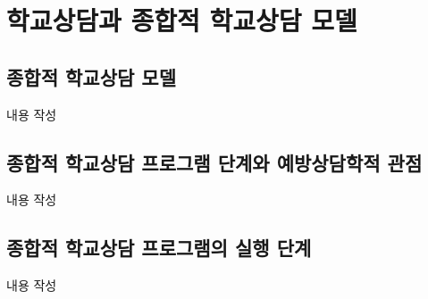 \section{학교상담과 종합적 학교상담 모델}

\subsection{종합적 학교상담 모델}
내용 작성

\subsection{종합적 학교상담 프로그램 단계와 예방상담학적 관점}
내용 작성

\subsection{종합적 학교상담 프로그램의 실행 단계}
내용 작성
